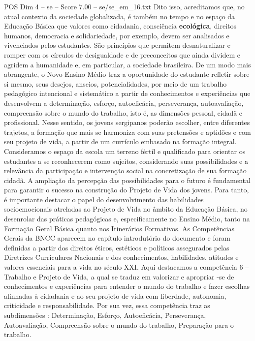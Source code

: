 \begin{textsample}{POS Dim 4 – se – Score 7.00 – se/se\_em\_16.txt}
Dito isso, acreditamos que, no atual contexto da sociedade globalizada, é também no tempo e no espaço da Educação Básica que valores como cidadania, consciência \textbf{ecológica}, direitos humanos, democracia e solidariedade, por exemplo, devem ser analisados e vivenciados pelos estudantes.
São princípios que permitem desnaturalizar e romper com os círculos de desigualdade e de preconceitos que ainda dividem e agridem a humanidade e, em particular, a sociedade brasileira.
De um modo mais abrangente, o Novo Ensino Médio traz a oportunidade do estudante refletir sobre si mesmo, seus desejos, anseios, potencialidades, por meio de um trabalho pedagógico intencional e sistemático a partir de conhecimentos e experiências que desenvolvem a determinação, esforço, autoeficácia, perseverança, autoavaliação, compreensão sobre o mundo do trabalho, isto é, as dimensões pessoal, cidadã e profissional.
Nesse sentido, os jovens sergipanos poderão escolher, entre diferentes trajetos, a formação que mais se harmoniza com suas pretensões e aptidões e com seu projeto de vida, a partir de um currículo embasado na formação integral.
Consideramos o espaço da escola um terreno fértil e qualificado para orientar os estudantes a se reconhecerem como sujeitos, considerando suas possibilidades e a relevância da participação e intervenção social na concretização de sua formação cidadã.
A ampliação da percepção das possibilidades para o futuro é fundamental para garantir o sucesso na construção do Projeto de Vida dos jovens.
Para tanto, é importante destacar o papel do desenvolvimento das habilidades socioemocionais atreladas ao Projeto de Vida no âmbito da Educação Básica, no desenrolar das práticas pedagógicas e, especificamente no Ensino Médio, tanto na Formação Geral Básica quanto nos Itinerários Formativos.
As Competências Gerais da BNCC aparecem no capítulo introdutório do documento e foram definidas a partir dos direitos éticos, estéticos e políticos assegurados pelas Diretrizes Curriculares Nacionais e dos conhecimentos, habilidades, atitudes e valores essenciais para a vida no século XXI.
Aqui destacamos a competência 6 – Trabalho e Projeto de Vida, a qual se traduz em valorizar e apropriar -se de conhecimentos e experiências para entender o mundo do trabalho e fazer escolhas alinhadas à cidadania e ao seu projeto de vida com liberdade, autonomia, criticidade e responsabilidade.
Por sua vez, essa competência traz as subdimensões : Determinação, Esforço, Autoeficácia, Perseverança, Autoavaliação, Compreensão sobre o mundo do trabalho, Preparação para o trabalho.

\end{textsample}
